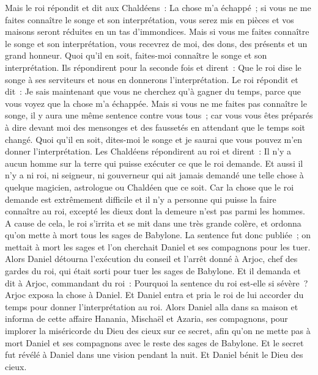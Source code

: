 \begin{multicols}{2}
Mais le roi répondit et dit aux Chaldéens~: La chose m'a échappé~; si vous ne me faites connaître le songe et son interprétation, vous serez mis en pièces et vos maisons seront réduites en un tas d'immondices.
Mais si vous me faites connaître le songe et son interprétation, vous recevrez de moi, des dons, des présents et un grand honneur. Quoi qu'il en soit, faites-moi connaître le songe et son interprétation.
Ils répondirent pour la seconde fois et dirent~: Que le roi dise le songe à ses serviteurs et nous en donnerons l'interprétation.
Le roi répondit et dit~: Je sais maintenant que vous ne cherchez qu'à gagner du temps, parce que vous voyez que la chose m'a échappée.
Mais si vous ne me faites pas connaître le songe, il y aura une même sentence contre vous tous~; car vous vous êtes préparés à dire devant moi des mensonges et des faussetés en attendant que le temps soit changé. Quoi qu'il en soit, dites-moi le songe et je saurai que vous pouvez m'en donner l'interprétation.
Les Chaldéens répondirent au roi et dirent~: Il n'y a aucun homme sur la terre qui puisse exécuter ce que le roi demande. Et aussi il n'y a ni roi, ni seigneur, ni gouverneur qui ait jamais demandé une telle chose à quelque magicien, astrologue ou Chaldéen que ce soit.
Car la chose que le roi demande est extrêmement difficile et il n'y a personne qui puisse la faire connaître au roi, excepté les dieux dont la demeure n'est pas parmi les hommes.
A cause de cela, le roi s'irrita et se mit dans une très grande colère, et ordonna qu'on mette à mort tous les sages de Babylone.
La sentence fut donc publiée~; on mettait à mort les sages et l'on cherchait Daniel et ses compagnons pour les tuer.
Alors Daniel détourna l'exécution du conseil et l'arrêt donné à Arjoc, chef des gardes du roi, qui était sorti pour tuer les sages de Babylone.
Et il demanda et dit à Arjoc, commandant du roi~: Pourquoi la sentence du roi est-elle si sévère~? Arjoc exposa la chose à Daniel.
Et Daniel entra et pria le roi de lui accorder du temps pour donner l'interprétation au roi.
Alors Daniel alla dans sa maison et informa de cette affaire Hanania, Mischaël et Azaria, ses compagnons,
pour implorer la miséricorde du Dieu des cieux sur ce secret, afin qu'on ne mette pas à mort Daniel et ses compagnons avec le reste des sages de Babylone.
Et le secret fut révélé à Daniel dans une vision pendant la nuit. Et Daniel bénit le Dieu des cieux.

\end{multicols}
